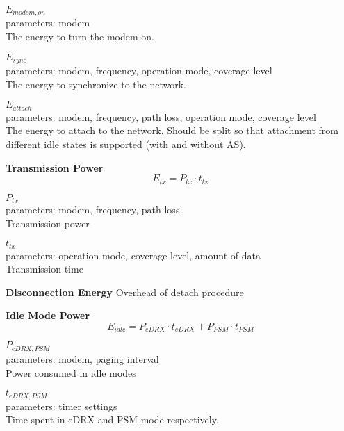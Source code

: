 $E_{modem,on}$\\
parameters: modem\\
The energy to turn the modem on.

$E_{sync}$\\
parameters: modem, frequency, operation mode, coverage level\\
The energy to synchronize to the network.

$E_{attach}$\\
parameters: modem, frequency, path loss, operation mode, coverage level\\
The energy to attach to the network. Should be split so that attachment from different idle states is supported (with and without AS).

\textbf{Transmission Power}
\begin{equation}
E_{tx} = P_{tx}\cdot t_{tx}
\end{equation}

$P_{tx}$\\
parameters: modem, frequency, path loss\\
Transmission power

$t_{tx}$\\
parameters: operation mode, coverage level, amount of data\\
Transmission time

\textbf{Disconnection Energy}
Overhead of detach procedure

\textbf{Idle Mode Power}
\begin{equation}
E_{idle} = P_{eDRX}\cdot t_{eDRX}+P_{PSM}\cdot t_{PSM}
\end{equation}

$P_{eDRX,PSM}$\\
parameters: modem, paging interval\\
Power consumed in idle modes

$t_{eDRX,PSM}$\\
parameters: timer settings\\
Time spent in eDRX and PSM mode respectively.








